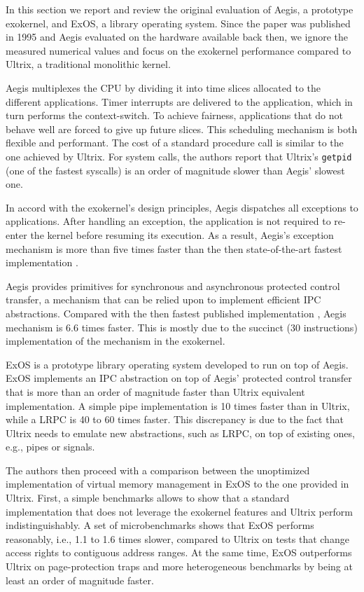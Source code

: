 
In this section we report and review the original evaluation of Aegis, a prototype exokernel, and ExOS, a library operating system.
Since the paper was published in 1995 and Aegis evaluated on the hardware available back then, we ignore the measured numerical values and focus on the exokernel performance compared to Ultrix, a traditional monolithic kernel.

Aegis multiplexes the CPU by dividing it into time slices allocated to the different applications.
Timer interrupts are delivered to the application, which in turn performs the context-switch.
To achieve fairness, applications that do not behave well are forced to give up future slices.
This scheduling mechanism is both flexible and performant.
The cost of a standard procedure call is similar to the one achieved by Ultrix.
For system calls, the authors report that Ultrix's \lstinline{getpid} (one of the fastest syscalls) is an order of magnitude slower than Aegis' slowest one.

In accord with the exokernel's design principles, Aegis dispatches all exceptions to applications.
After handling an exception, the application is not required to re-enter the kernel before resuming its execution.
As a result, Aegis's exception mechanism is more than five times faster than the then state-of-the-art fastest implementation \cite{DBLP:conf/asplos/ThekkathL94}.

Aegis provides primitives for synchronous and asynchronous protected control transfer, a mechanism that can be relied upon to implement efficient IPC abstractions.
Compared with the then fastest published implementation \cite{DBLP:conf/sosp/Liedtke93}, Aegis mechanism is 6.6 times faster.
This is mostly due to the succinct (30 instructions) implementation of the mechanism in the exokernel.

ExOS is a prototype library operating system developed to run on top of Aegis.
ExOS implements an IPC abstraction on top of Aegis' protected control transfer that is more than an order of magnitude faster than Ultrix equivalent implementation.
A simple pipe implementation is 10 times faster than in Ultrix, while a LRPC is 40 to 60 times faster.
This discrepancy is due to the fact that Ultrix needs to emulate new abstractions, such as LRPC, on top of existing ones, e.g., pipes or signals.

The authors then proceed with a comparison between the unoptimized implementation of virtual memory management in ExOS to the one provided in Ultrix.
First, a simple benchmarks allows to show that a standard implementation that does not leverage the exokernel features and Ultrix perform indistinguishably.
A set of microbenchmarks shows that ExOS performs reasonably, i.e., 1.1 to 1.6 times slower, compared to Ultrix on tests that change access rights to contiguous address ranges.
At the same time, ExOS outperforms Ultrix on page-protection traps and more heterogeneous benchmarks by being at least an order of magnitude faster.